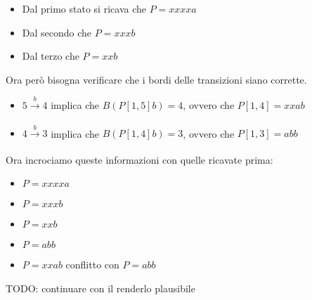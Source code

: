 \begin{itemize}
    \item Dal primo stato si ricava che $P = xxxxa$
    \item Dal secondo che $P = xxxb$
    \item Dal terzo che $P = xxb$
\end{itemize}

Ora per\`o bisogna verificare che i bordi delle transizioni siano corrette.

\begin{itemize}
    \item $5 \xrightarrow[]{b} 4$ implica che $B(P[1,5]b) = 4$, ovvero che $P[1,4] = xxab$
    \item $4 \xrightarrow[]{b} 3$ implica che $B(P[1,4]b) = 3$, ovvero che $P[1,3] = abb$
\end{itemize}

Ora incrociamo queste informazioni con quelle ricavate prima:

\begin{itemize}
    \item $P = xxxxa$
    \item $P = xxxb$
    \item $P = xxb$
    \item $P = abb$
    \item $P = xxab$ conflitto con $P = abb$
\end{itemize}

TODO: continuare con il renderlo plausibile
